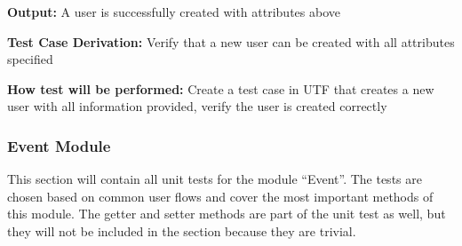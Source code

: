 \documentclass[12pt, titlepage]{article}
\begin{document}
\begin{enumerate}
\textbf{Output:} A user is successfully created with attributes above


\textbf{Test Case Derivation:} Verify that a new user can be created with all attributes specified

\textbf{How test will be performed:} Create a test case in UTF that creates a new user with all information provided, verify the user is created correctly
\end{enumerate}

\subsubsection{Event Module}

This section will contain all unit tests for the module ``Event''. The tests are chosen based on common user flows and cover the most important methods of this module. The getter and setter methods are part of the unit test as well, but they will not be included in the section because they are trivial.
\end{document}
